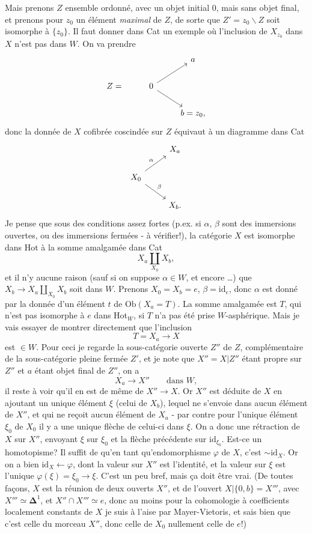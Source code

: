 \documentclass[11pt]{article}
\newcommand{\printedpage}[1]{\marginpar{\footnotesize p.~#1}}
\newcommand{\msp}[1]{\marginpar{\footnotesize [#1]}}
\begin{document}
Mais prenons $Z$ ensemble ordonné, avec un objet initial $0$, mais sans objet final, et prenons pour $z_0$ un élément \textit{maximal} de $Z$, de sorte que $Z' = z_0\backslash Z$ soit isomorphe à $\{z_0\}$. Il faut donner dans Cat un exemple où l'inclusion de $X_{z_0}$ dans $X$ n'est pas dans $W$. On va prendre
\printedpage{117}
\[
\begin{tikzcd}
 & & a \\
Z = & 0 \arrow[ur] \arrow[dr] & \\
 & & b = z_0,
\end{tikzcd}
\]
donc la donnée de $X$ cofibrée coscindée sur $Z$ équivaut à un diagramme dans Cat
\[
\begin{tikzcd}
 & X_a \\
X_0 \arrow[ur, "\alpha"] \arrow[dr, "\beta"] & \\
 & X_b.
\end{tikzcd}
\]
Je pense que sous des conditions assez fortes (p.ex. si $\alpha$, $\beta$ sont des immersions ouvertes, ou des immersions fermées - à vérifier!), la catégorie $X$ est isomorphe dans Hot à la somme amalgamée dans Cat
\[ X_a{\textstyle\coprod_{X_0}}X_b, \]
et il n'y aucune raison (sauf si on suppose $\alpha \in W$, et encore \dots) que $X_b \longrightarrow X_a \coprod_{X_0} X_b$ soit dans $W$. Prenons $X_0 = X_b = e$, $\beta = \mathrm{id}_e$, donc $\alpha$ est donné par la donnée d'un élément $t$ de $\mathrm{Ob}(X_a = T)$. La somme amalgamée est $T$, qui n'est pas isomorphe à $e$ dans $\mathrm{Hot}_W$,
\msp{page 190}
si $T$ n'a pas été prise $W$-asphérique. Mais je vais essayer de montrer directement que l'inclusion
\[ T = X_a \longrightarrow X \]
est $\in W$. Pour ceci je regarde la sous-catégorie ouverte $Z''$ de $Z$, complémentaire de la sous-catégorie pleine fermée $Z'$, et je note que $X'' = X|Z''$ étant propre sur $Z''$ et $a$ étant objet final de $Z''$, on a
\[ X_a \longrightarrow X'' \qquad \text{dans } W, \]
il reste à voir qu'il en est de même de $X'' \longrightarrow X$. Or $X''$ est déduite de $X$ en ajoutant un unique élément $\xi$ (celui de $X_b$), lequel ne s'envoie dans aucun élément de $X''$, et qui ne reçoit aucun élément de $X_a$ - par contre pour l'unique élément $\xi_0$ de $X_0$ il y a une unique flèche de celui-ci dans $\xi$. On a donc une rétraction de $X$ sur $X''$, envoyant $\xi$ sur $\xi_0$ et la flèche précédente sur $\mathrm{id}_{\xi_0}$. Est-ce un homotopisme? Il suffit de qu'en tant qu'endomorphisme $\varphi$ de $X$, c'est $\sim \mathrm{id}_X$. Or on a bien $\mathrm{id}_X \longleftarrow \varphi$, dont la valeur sur $X''$ est l'identité, et la valeur sur $\xi$ est l'unique $\varphi(\xi) = \xi_0 \longrightarrow \xi$. C'est un peu bref, mais ça doit être vrai. (De toutes façons, $X$ est la réunion de deux ouverts $X''$, et de l'ouvert $X|\{0,b\} = X'''$, avec $X''' \simeq \mathbf{\Delta}^1$, et $X'' \cap X''' \simeq e$, donc au moins pour la cohomologie à coefficients localement constants de $X$ je suis à l'aise par Mayer-Vietoris, et sais bien que c'est celle du morceau $X''$, donc celle de $X_0$ nullement celle de $e$!)
\end{document}
